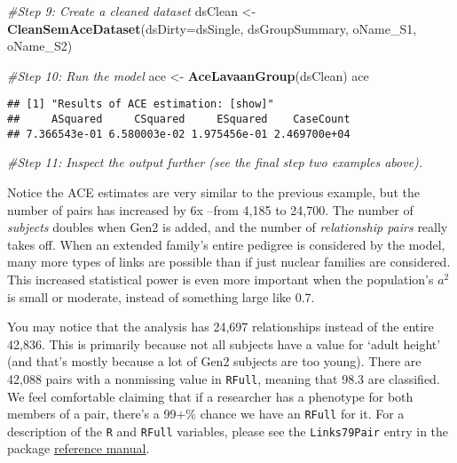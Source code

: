 \documentclass[smallextended]{svjour3}       %
\newenvironment{Shaded}{\begin{snugshade}}{\end{snugshade}}
\newcommand{\CommentTok}[1]{\textcolor[rgb]{0.56,0.35,0.01}{\textit{#1}}}
\newcommand{\DataTypeTok}[1]{\textcolor[rgb]{0.13,0.29,0.53}{#1}}
\newcommand{\KeywordTok}[1]{\textcolor[rgb]{0.13,0.29,0.53}{\textbf{#1}}}
\newcommand{\NormalTok}[1]{#1}
\newcommand{\StringTok}[1]{\textcolor[rgb]{0.31,0.60,0.02}{#1}}
\begin{document}
\begin{Shaded}
\begin{Highlighting}[]
\CommentTok{#Step 9: Create a cleaned dataset}
\NormalTok{dsClean <-}\StringTok{ }\KeywordTok{CleanSemAceDataset}\NormalTok{(}\DataTypeTok{dsDirty=}\NormalTok{dsSingle, dsGroupSummary, oName_S1, oName_S2)}

\CommentTok{#Step 10: Run the model}
\NormalTok{ace <-}\StringTok{ }\KeywordTok{AceLavaanGroup}\NormalTok{(dsClean)}
\NormalTok{ace}
\end{Highlighting}
\end{Shaded}

\begin{verbatim}
## [1] "Results of ACE estimation: [show]"
##     ASquared     CSquared     ESquared    CaseCount 
## 7.366543e-01 6.580003e-02 1.975456e-01 2.469700e+04
\end{verbatim}

\begin{Shaded}
\begin{Highlighting}[]
\CommentTok{#Step 11: Inspect the output further (see the final step two examples above).}
\end{Highlighting}
\end{Shaded}

Notice the ACE estimates are very similar to the previous example, but
the number of pairs has increased by 6x --from 4,185 to 24,700. The
number of \emph{subjects} doubles when Gen2 is added, and the number of
\emph{relationship pairs} really takes off. When an extended family's
entire pedigree is considered by the model, many more types of links are
possible than if just nuclear families are considered. This increased
statistical power is even more important when the population's \(a^2\)
is small or moderate, instead of something large like 0.7.

You may notice that the analysis has 24,697 relationships instead of the
entire 42,836. This is primarily because not all subjects have a value
for `adult height' (and that's mostly because a lot of Gen2 subjects are
too young). There are 42,088 pairs with a nonmissing value in
\texttt{RFull}, meaning that 98.3 are classified. We feel comfortable
claiming that if a researcher has a phenotype for both members of a
pair, there's a 99+\% chance we have an \texttt{RFull} for it. For a
description of the \texttt{R} and \texttt{RFull} variables, please see
the \texttt{Links79Pair} entry in the package
\href{https://nlsy-links.github.io/NlsyLinks/}{reference
manual}.
\end{document}
